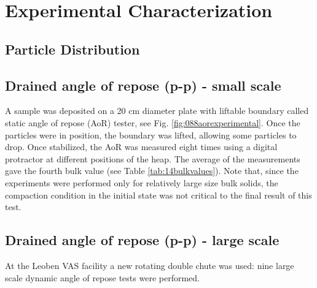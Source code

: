 
\chapter[Experimental Characterization]{Experimental Characterization}
\label{cap:experimentalcharacterization}




\section{Particle Distribution}
\label{sec:particledistribution}


\section{Drained angle of repose (p-p) - small scale}
\label{sec:aor}

A sample was deposited on a 20 cm diameter plate with liftable
boundary called static angle of repose (\acs{AoR}) tester, see Fig. \ref{fig:088aorexperimental}.
Once the particles were in position, the boundary was lifted, allowing some particles to drop. 
Once stabilized, the \acs{AoR} was measured eight times using a digital protractor at different positions of the heap. 
The average of the measurements gave the fourth bulk value (see Table
\ref{tab:14bulkvalues}).
Note that, since the experiments were performed only for relatively large size
bulk solids, the compaction condition in the initial state was not critical to the
final result of this test.\\


\section{Drained angle of repose (p-p) - large scale}
\label{sec:aorlargescale}

At the Leoben VAS facility a new rotating double chute was used: 
nine large scale dynamic angle of repose tests were performed. 


